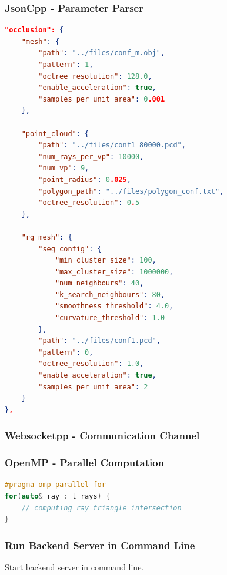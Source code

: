 \documentclass[11pt, a4paper,oneside,chapterprefix=false]{scrbook}
\begin{document}
\subsubsection{JsonCpp - Parameter Parser} \label{subsec:jsoncpp}

\begin{lstlisting}[language=json, caption=Json Configuration File]
"occlusion": {
	"mesh": {
		"path": "../files/conf_m.obj",
		"pattern": 1,
		"octree_resolution": 128.0,
		"enable_acceleration": true,
		"samples_per_unit_area": 0.001
	},

	"point_cloud": {
		"path": "../files/conf1_80000.pcd",
		"num_rays_per_vp": 10000, 
		"num_vp": 9, 
		"point_radius": 0.025,
		"polygon_path": "../files/polygon_conf.txt",
		"octree_resolution": 0.5
	},

	"rg_mesh": {
		"seg_config": {
			"min_cluster_size": 100,
			"max_cluster_size": 1000000,
			"num_neighbours": 40,
			"k_search_neighbours": 80,
			"smoothness_threshold": 4.0,
			"curvature_threshold": 1.0
		},
		"path": "../files/conf1.pcd",
		"pattern": 0,
		"octree_resolution": 1.0,
		"enable_acceleration": true,
		"samples_per_unit_area": 2
	}
},
\end{lstlisting}

\subsubsection{Websocketpp - Communication Channel} \label{subsec:websocketpp}

\subsubsection{OpenMP - Parallel Computation} \label{subsec:openmp}
\begin{lstlisting}[language=C++, caption=Region Growing]
#pragma omp parallel for
for(auto& ray : t_rays) {
	// computing ray triangle intersection
}
\end{lstlisting}

\subsubsection{Run Backend Server in Command Line} \label{subsec:backend command line}

Start backend server in command line.
\end{document}
